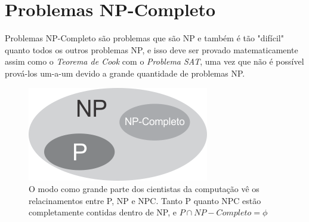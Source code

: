 \section{Problemas NP-Completo}
Problemas NP-Completo são problemas que são NP e também é tão "difícil" quanto todos os outros problemas NP, e isso deve ser provado matematicamente assim como o \textit{Teorema de Cook} com o \textit{Problema SAT}, uma vez que não é possível prová-los um-a-um devido a grande quantidade de problemas NP.

	\begin{figure}[H]
		\centering
		\label{fig1}
		\includegraphics[scale=2]{./figuras/figProblemas.png}
		\caption{O modo como grande parte dos cientistas da computação vê os relacinamentos entre P, NP e NPC. Tanto P quanto NPC estão completamente contidas dentro de NP, e $P \cap NP-Completo = \phi$ \cite{leisersonalgoritmos}}
	\end{figure}

